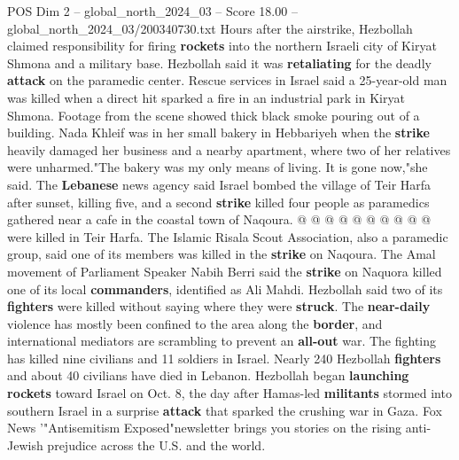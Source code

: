 \begin{textsample}{POS Dim 2 – global\_north\_2024\_03 – Score 18.00 – global\_north\_2024\_03/200340730.txt}
Hours after the airstrike, Hezbollah claimed responsibility for firing \textbf{rockets} into the northern Israeli city of Kiryat Shmona and a military base.
Hezbollah said it was \textbf{retaliating} for the deadly \textbf{attack} on the paramedic center.
Rescue services in Israel said a 25-year-old man was killed when a direct hit sparked a fire in an industrial park in Kiryat Shmona.
Footage from the scene showed thick black smoke pouring out of a building.
Nada Khleif was in her small bakery in Hebbariyeh when the \textbf{strike} heavily damaged her business and a nearby apartment, where two of her relatives were unharmed."The bakery was my only means of living.
It is gone now,"she said.
The \textbf{Lebanese} news agency said Israel bombed the village of Teir Harfa after sunset, killing five, and a second \textbf{strike} killed four people as paramedics gathered near a cafe in the coastal town of Naqoura. @ @ @ @ @ @ @ @ @ @ were killed in Teir Harfa.
The Islamic Risala Scout Association, also a paramedic group, said one of its members was killed in the \textbf{strike} on Naqoura.
The Amal movement of Parliament Speaker Nabih Berri said the \textbf{strike} on Naquora killed one of its local \textbf{commanders}, identified as Ali Mahdi.
Hezbollah said two of its \textbf{fighters} were killed without saying where they were \textbf{struck}.
The \textbf{near-daily} violence has mostly been confined to the area along the \textbf{border}, and international mediators are scrambling to prevent an \textbf{all-out} war.
The fighting has killed nine civilians and 11 soldiers in Israel.
Nearly 240 Hezbollah \textbf{fighters} and about 40 civilians have died in Lebanon.
Hezbollah began \textbf{launching} \textbf{rockets} toward Israel on Oct. 8, the day after Hamas-led \textbf{militants} stormed into southern Israel in a surprise \textbf{attack} that sparked the crushing war in Gaza.
Fox News '"Antisemitism Exposed"newsletter brings you stories on the rising anti-Jewish prejudice across the U.S. and the world.

\end{textsample}
